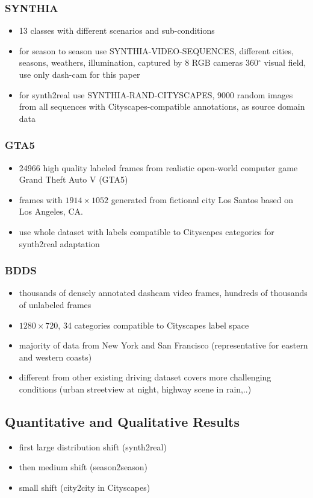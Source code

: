 \documentclass[]{article}
\begin{document}
\subsubsection{SYNTHIA}
\begin{itemize}
	\item 13 classes with different scenarios and sub-conditions
	\item for season to season use SYNTHIA-VIDEO-SEQUENCES, different cities, seasons, weathers, illumination, captured by 8 RGB cameras 360$^{\circ}$ visual field, use only dash-cam for this paper
	\item for synth2real use SYNTHIA-RAND-CITYSCAPES, 9000 random images from all sequences with Cityscapes-compatible annotations, as source domain data
\end{itemize}

\subsubsection{GTA5}
\begin{itemize}
	\item 24966 high quality labeled frames from realistic open-world computer game Grand Theft Auto V (GTA5)
	\item frames with $1914 \times 1052$ generated from fictional city Los Santos based on Los Angeles, CA.
	\item use whole dataset with labels compatible to Cityscapes categories for synth2real adaptation
\end{itemize}

\subsubsection{BDDS}
\begin{itemize}
	\item thousands of densely annotated dashcam video frames, hundreds of thousands of unlabeled frames
	\item $1280 \times 720$, 34 categories compatible to Cityscapes label space
	\item majority of data from New York and San Francisco (representative for eastern and western coasts)
	\item different from other existing driving dataset covers more challenging conditions (urban streetview at night, highway scene in rain,..)
\end{itemize}

\subsection{Quantitative and Qualitative Results}
\begin{itemize}
	\item first large distribution shift (synth2real)
	\item then medium shift (season2season)
	\item small shift (city2city in Cityscapes)
\end{itemize}
\end{document}
